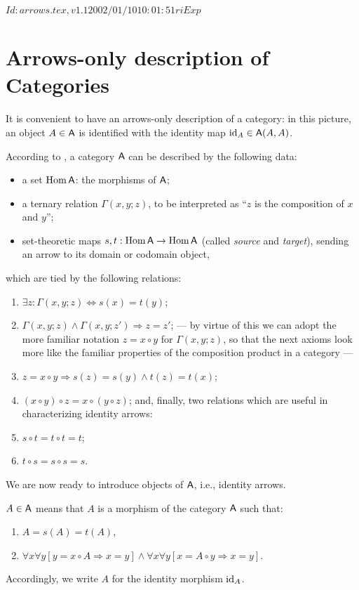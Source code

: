 \RCSID $Id: arrows.tex,v 1.1 2002/01/10 10:01:51 ri Exp $


\chapter{Arrows-only description of Categories}
\label{cha:arrows-only}

It is convenient to have an arrows-only description of a category: in
this picture, an object $A \in \mathsf{A}$ is identified with the identity map
$\operatorname{id}_A \in \mathsf{A}(A, A)$.

According to \cite{lawvere;1965}, a category $\mathsf{A}$ can be described by
the following data:
\begin{itemize}
\item a set $\operatorname{Hom}\mathsf{A}$: the morphisms of $\mathsf{A}$;
\item a ternary relation $\Gamma(x,y;z)$, to be interpreted as ``$z$ is
  the composition of $x$ and $y$'';
\item set-theoretic maps $s,t: \operatorname{Hom}\mathsf{A} \to \operatorname{Hom}\mathsf{A}$ (called \emph{source}
  and \emph{target}), sending an arrow to its domain or codomain
  object,
\end{itemize}
which are tied by the following relations:
\begin{enumerate}
\item $\exists z: \Gamma(x,y;z) \Leftrightarrow s(x) = t(y)$; \label{item:A1}
\item $\Gamma(x,y;z) \land \Gamma(x,y;z') \Rightarrow z = z'$;
--- by virtue of this we can adopt the more familiar notation $z = x\circ
y$ for $\Gamma(x,y; z)$, so that the next axioms look more like the
familiar properties of the composition product in a category ---
\item $z = x\circ y \Rightarrow s(z) = s(y) \land t(z) = t(x)$;
\item $(x\circ y) \circ z = x \circ (y \circ z)$;
and, finally, two relations which are useful in characterizing
identity arrows:
\item $s \circ t = t \circ t = t$;
\item $t \circ s = s \circ s = s$.
\end{enumerate}

We are now ready to introduce objects of $\mathsf{A}$, i.e., identity
arrows. 
\begin{definition}\label{dfn:object}
  $A\in \mathsf{A}$ means that $A$ is a morphism of the category $\mathsf{A}$
  such that:
  \begin{enumerate}
  \item $A = s(A) = t(A)$, \label{item:AO1}
  \item $\forall x\forall y[ y = x \circ A \Rightarrow x = y] \land \forall x\forall y [
    x = A \circ y \Rightarrow x = y]$. \label{item:AO2} 
  \end{enumerate}
\end{definition}
Accordingly, we write $A$ for the identity morphism $\operatorname{id}_A$.

